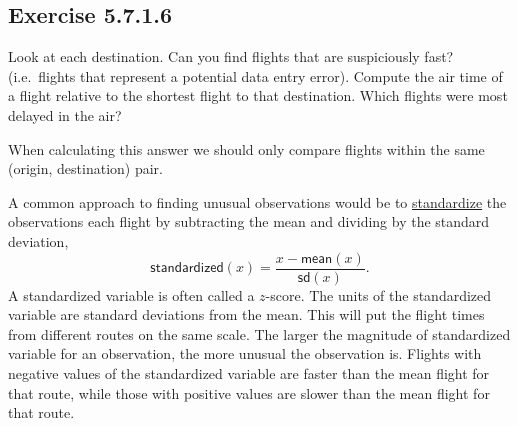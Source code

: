\documentclass[]{book}
\newenvironment{Shaded}{\begin{snugshade}}{\end{snugshade}}
\newcommand{\DataTypeTok}[1]{\textcolor[rgb]{0.13,0.29,0.53}{#1}}
\newcommand{\KeywordTok}[1]{\textcolor[rgb]{0.13,0.29,0.53}{\textbf{#1}}}
\newcommand{\NormalTok}[1]{#1}
\newcommand{\OperatorTok}[1]{\textcolor[rgb]{0.81,0.36,0.00}{\textbf{#1}}}
\newcommand{\StringTok}[1]{\textcolor[rgb]{0.31,0.60,0.02}{#1}}
\theoremstyle{plain}
\theoremstyle{remark}
\begin{document}
\hypertarget{exercise-5.7.1.6}{%
\subsection*{\texorpdfstring{Exercise {5.7.1.6}}{Exercise 5.7.1.6}}\label{exercise-5.7.1.6}}

Look at each destination. Can you find flights that are suspiciously fast? (i.e.~flights that represent a potential data entry error). Compute the air time of a flight relative to the shortest flight to that destination. Which flights were most delayed in the air?

When calculating this answer we should only compare flights within the same (origin, destination) pair.

A common approach to finding unusual observations would be to \href{https://en.wikipedia.org/wiki/Standard_score}{standardize} the
observations each flight by subtracting the mean and dividing by the standard deviation,
\[
\mathsf{standardized}(x) = \frac{x - \mathsf{mean}(x)}{\mathsf{sd}(x)} .
\]
A standardized variable is often called a \(z\)-score.
The units of the standardized variable are standard deviations from the mean.
This will put the flight times from different routes on the same scale.
The larger the magnitude of standardized variable for an observation, the more unusual the observation is.
Flights with negative values of the standardized variable are faster than the
mean flight for that route, while those with positive values are slower than
the mean flight for that route.

\begin{Shaded}
\end{Shaded}
\end{document}
